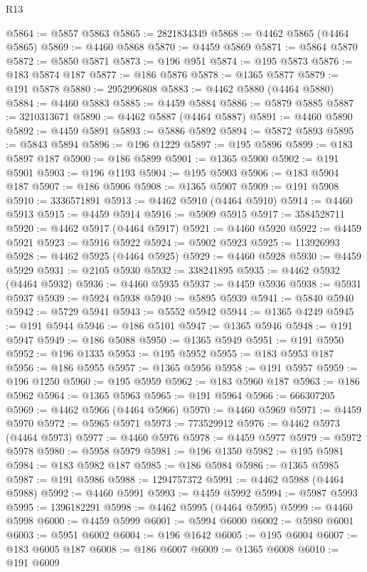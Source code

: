 \begin{lexlean}{R13}
\begin{coremodule}
@5864 := @5857 @5863
@5865 := 2821834349
@5868 := @4462 @5865 (@4464 @5865)
@5869 := @4460 @5868
@5870 := @4459 @5869
@5871 := @5864 @5870
@5872 := @5850 @5871
@5873 := @196 @951
@5874 := @195 @5873
@5876 := @183 @5874 @187
@5877 := @186 @5876
@5878 := @1365 @5877
@5879 := @191 @5878
@5880 := 2952996808
@5883 := @4462 @5880 (@4464 @5880)
@5884 := @4460 @5883
@5885 := @4459 @5884
@5886 := @5879 @5885
@5887 := 3210313671
@5890 := @4462 @5887 (@4464 @5887)
@5891 := @4460 @5890
@5892 := @4459 @5891
@5893 := @5886 @5892
@5894 := @5872 @5893
@5895 := @5843 @5894
@5896 := @196 @1229
@5897 := @195 @5896
@5899 := @183 @5897 @187
@5900 := @186 @5899
@5901 := @1365 @5900
@5902 := @191 @5901
@5903 := @196 @1193
@5904 := @195 @5903
@5906 := @183 @5904 @187
@5907 := @186 @5906
@5908 := @1365 @5907
@5909 := @191 @5908
@5910 := 3336571891
@5913 := @4462 @5910 (@4464 @5910)
@5914 := @4460 @5913
@5915 := @4459 @5914
@5916 := @5909 @5915
@5917 := 3584528711
@5920 := @4462 @5917 (@4464 @5917)
@5921 := @4460 @5920
@5922 := @4459 @5921
@5923 := @5916 @5922
@5924 := @5902 @5923
@5925 := 113926993
@5928 := @4462 @5925 (@4464 @5925)
@5929 := @4460 @5928
@5930 := @4459 @5929
@5931 := @2105 @5930
@5932 := 338241895
@5935 := @4462 @5932 (@4464 @5932)
@5936 := @4460 @5935
@5937 := @4459 @5936
@5938 := @5931 @5937
@5939 := @5924 @5938
@5940 := @5895 @5939
@5941 := @5840 @5940
@5942 := @5729 @5941
@5943 := @5552 @5942
@5944 := @1365 @4249
@5945 := @191 @5944
@5946 := @186 @5101
@5947 := @1365 @5946
@5948 := @191 @5947
@5949 := @186 @5088
@5950 := @1365 @5949
@5951 := @191 @5950
@5952 := @196 @1335
@5953 := @195 @5952
@5955 := @183 @5953 @187
@5956 := @186 @5955
@5957 := @1365 @5956
@5958 := @191 @5957
@5959 := @196 @1250
@5960 := @195 @5959
@5962 := @183 @5960 @187
@5963 := @186 @5962
@5964 := @1365 @5963
@5965 := @191 @5964
@5966 := 666307205
@5969 := @4462 @5966 (@4464 @5966)
@5970 := @4460 @5969
@5971 := @4459 @5970
@5972 := @5965 @5971
@5973 := 773529912
@5976 := @4462 @5973 (@4464 @5973)
@5977 := @4460 @5976
@5978 := @4459 @5977
@5979 := @5972 @5978
@5980 := @5958 @5979
@5981 := @196 @1350
@5982 := @195 @5981
@5984 := @183 @5982 @187
@5985 := @186 @5984
@5986 := @1365 @5985
@5987 := @191 @5986
@5988 := 1294757372
@5991 := @4462 @5988 (@4464 @5988)
@5992 := @4460 @5991
@5993 := @4459 @5992
@5994 := @5987 @5993
@5995 := 1396182291
@5998 := @4462 @5995 (@4464 @5995)
@5999 := @4460 @5998
@6000 := @4459 @5999
@6001 := @5994 @6000
@6002 := @5980 @6001
@6003 := @5951 @6002
@6004 := @196 @1642
@6005 := @195 @6004
@6007 := @183 @6005 @187
@6008 := @186 @6007
@6009 := @1365 @6008
@6010 := @191 @6009

\end{coremodule}
\end{lexlean}
